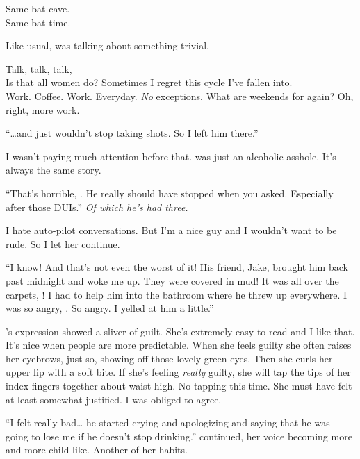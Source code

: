 {}
\noindent
Same bat-cave. \\
Same bat-time.
\VV


\noindent
Like usual, \april{} was talking about something trivial.
\VV


\noindent
Talk, talk, talk,
\\
Is that all women do?
Sometimes I regret this cycle I've fallen into.
\\
Work.  Coffee.  Work. Everyday. \textit{No} exceptions.
What are weekends for again?  Oh, right, more work.
\VV


``\ldots{}and \eric{} just wouldn't stop taking shots.  So I left him there.''
\VV


\noindent
I wasn't paying much attention before that.
\eric{} was just an alcoholic asshole.  It's always the same story.
\VV


``That's horrible, \april.  He really should have stopped when you asked.
Especially after those DUIs.'' \textit{Of which he's had three.}
\VV


\noindent
I hate auto-pilot conversations.
But I'm a nice guy and I wouldn't want to be rude.
So I let her continue.
\VV


``I know! And that's not even the worst of it!
His friend, Jake, brought him back past midnight and woke me up.
They were covered in mud!  It was all over the carpets, \josh!
I had to help him into the bathroom where he threw up everywhere.
I was so angry, \josh.  So angry.  I yelled at him a little.''
\VV


\noindent
\april's expression showed a sliver of guilt.
She's extremely easy to read and I like that.
It's nice when people are more predictable.
When she feels guilty she often raises her eyebrows, just so, showing off
those lovely green eyes.  Then she curls her upper lip with a soft bite.
If she's feeling \textit{really} guilty, she will tap the tips of her
index fingers together about waist-high.
No tapping this time.  She must have felt at least somewhat justified.
I was obliged to agree.
\VV


``I felt really bad\ldots{} he started crying and apologizing and saying that he
was going to lose me if he doesn't stop drinking.''
\april{} continued, her voice becoming more and more child-like.
Another of her habits.
\VV


